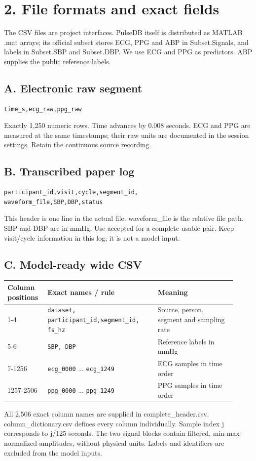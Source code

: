 \documentclass[11pt,letterpaper]{article}
\begin{document}
\section*{2. File formats and exact fields}
The CSV files are project interfaces. PulseDB itself is distributed as MATLAB .mat arrays; its official subset stores ECG, PPG and ABP in Subset.Signals, and labels in Subset.SBP and Subset.DBP. We use ECG and PPG as predictors. ABP supplies the public reference labels.
\subsection*{A. Electronic raw segment}
\begin{verbatim}time_s,ecg_raw,ppg_raw\end{verbatim}
Exactly 1,250 numeric rows. Time advances by 0.008 seconds. ECG and PPG are measured at the same timestamps; their raw units are documented in the session settings. Retain the continuous source recording.
\subsection*{B. Transcribed paper log}
\begin{verbatim}participant_id,visit,cycle,segment_id,
waveform_file,SBP,DBP,status\end{verbatim}
This header is one line in the actual file. waveform\_file is the relative file path. SBP and DBP are in mmHg. Use accepted for a complete usable pair. Keep visit/cycle information in this log; it is not a model input.
\subsection*{C. Model-ready wide CSV}

\par\smallskip
\begin{tabular}{@{}p{0.15\linewidth}p{0.45\linewidth}p{0.32\linewidth}@{}}\toprule
Column positions & Exact names / rule & Meaning\\\midrule
1-4 & \texttt{dataset, participant\_id,}\newline\texttt{segment\_id, fs\_hz} & Source, person, segment and sampling rate\\
5-6 & \texttt{SBP, DBP} & Reference labels in mmHg\\
7-1256 & \texttt{ecg\_0000} ... \texttt{ecg\_1249} & ECG samples in time order\\
1257-2506 & \texttt{ppg\_0000} ... \texttt{ppg\_1249} & PPG samples in time order\\
\bottomrule\end{tabular}\par\smallskip
All 2,506 exact column names are supplied in complete\_header.csv. column\_dictionary.csv defines every column individually. Sample index j corresponds to j/125 seconds. The two signal blocks contain filtered, min-max-normalized amplitudes, without physical units. Labels and identifiers are excluded from the model inputs.\newpage
\end{document}
